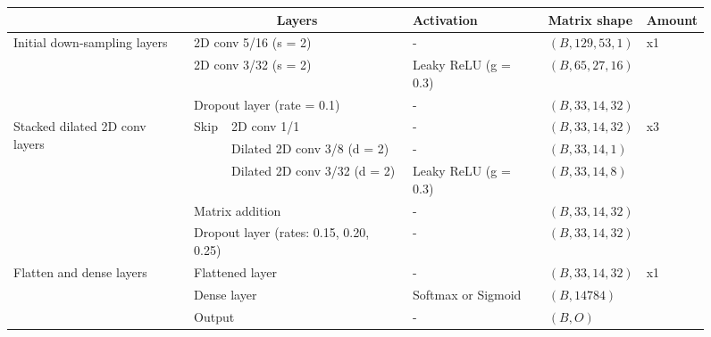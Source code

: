 \documentclass[12pt]{article}
\begin{document}
    \begin{figure}[H]
        \centering
        \begin{scriptsize}
            \begin{tabular}{l|l|l|l|l|l|l|l|l|}
                &\multicolumn{5}{c|}{Layers} & Activation & Matrix shape & Amount\\
                \hline
                \hline
                \multirow{3}{2cm}{Initial down-sampling layers} &\multicolumn{5}{|l|}{2D conv 5/16 (s = 2)} & - & $(B, 129, 53, 1)$ &\multirow{3}{*}{x1}\\
                \cline{2-8}
                &\multicolumn{5}{|l|}{2D conv 3/32 (s = 2)} & Leaky ReLU (g = 0.3) & $(B, 65, 27, 16)$ &\\
                \cline{2-8}
                &\multicolumn{5}{|l|}{Dropout layer (rate = 0.1)} & - & $(B, 33, 14, 32)$ &\\
                \bottomrule
                \multirow{5}{2cm}{Stacked dilated 2D conv layers} &\multirow{3}{*}{Skip} & \multicolumn{4}{l|}{2D conv 1/1} & - & $(B, 33, 14, 32)$ & \multirow{5}{*}{x3}\\
                \cline{3-8}
                & & \multicolumn{4}{l|}{Dilated 2D conv 3/8 (d = 2)} & - & $(B, 33, 14, 1)$ &\\
                \cline{3-8}
                & &\multicolumn{4}{l|}{Dilated 2D conv 3/32 (d = 2)} & Leaky ReLU (g = 0.3) & $(B, 33, 14, 8)$ &\\
                \cline{2-8}
                & \multicolumn{5}{|l|}{Matrix addition} & - & $(B, 33, 14, 32)$ &\\
                \cline{2-8}
                & \multicolumn{5}{|l|}{Dropout layer (rates: 0.15, 0.20, 0.25)} & - & $(B, 33, 14, 32)$ &\\
                \bottomrule
                \multirow{3}{2cm}{Flatten and dense layers} & \multicolumn{5}{|l|}{Flattened layer} & - & $(B, 33, 14, 32)$ & \multirow{3}{*}{x1}\\
                \cline{2-8}
                & \multicolumn{5}{|l|}{Dense layer} & Softmax or Sigmoid & $(B, 14784)$ &\\
                \cline{2-8}
                & \multicolumn{5}{|l|}{Output} & - & $(B, O)$ &\\
                \bottomrule
            \end{tabular}
        \end{scriptsize}

\end{figure}
\end{document}
